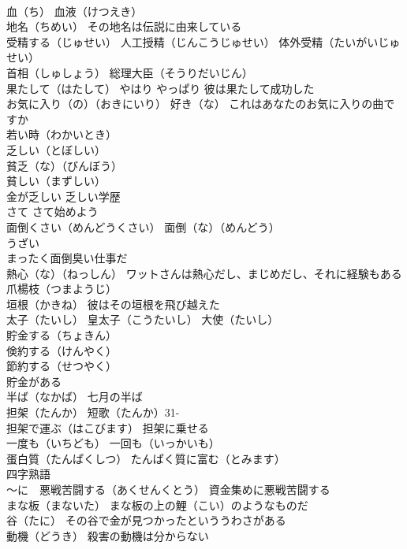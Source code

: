 \documentclass[8pt]{extreport}
\begin{document}
\begin{CJK}{UTF8}{min}
\\	血（ち） 血液（けつえき）
\\	地名（ちめい） その地名は伝説に由来している
\\	受精する（じゅせい） 人工授精（じんこうじゅせい） 体外受精（たいがいじゅせい）
\\	首相（しゅしょう） 総理大臣（そうりだいじん）
\\	果たして（はたして） やはり やっぱり 彼は果たして成功した
\\	お気に入り（の）（おきにいり） 好き（な） これはあなたのお気に入りの曲ですか
\\	若い時（わかいとき）
\\	乏しい（とぼしい） 
\\	貧乏（な）（びんぼう）
\\	貧しい（まずしい）
\\	金が乏しい 乏しい学歴
\\	さて さて始めよう
\\	面倒くさい（めんどうくさい） 面倒（な）（めんどう）
\\	うざい
\\	まったく面倒臭い仕事だ
\\	熱心（な）（ねっしん） ワットさんは熱心だし、まじめだし、それに経験もある
\\	爪楊枝（つまようじ）
\\	垣根（かきね） 彼はその垣根を飛び越えた
\\	太子（たいし） 皇太子（こうたいし） 大使（たいし） 
\\	貯金する（ちょきん）
\\	倹約する（けんやく） 
\\	節約する（せつやく） 
\\	貯金がある
\\	半ば（なかば） 七月の半ば
\\	担架（たんか） 短歌（たんか）31-
\\	担架で運ぶ（はこびます） 担架に乗せる
\\	一度も（いちども） 一回も（いっかいも）
\\	蛋白質（たんぱくしつ） たんぱく質に富む（とみます）
\\	四字熟語 
\\	～に　悪戦苦闘する（あくせんくとう） 資金集めに悪戦苦闘する
\\	まな板（まないた） まな板の上の鯉（こい）のようなものだ
\\	谷（たに） その谷で金が見つかったといううわさがある
\\	動機（どうき） 殺害の動機は分からない

\end{CJK}
\end{document}

